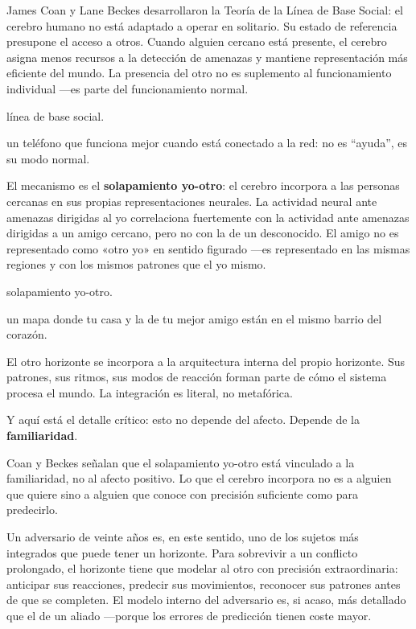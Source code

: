 \noindent James Coan y Lane Beckes desarrollaron la Teoría de la Línea de Base Social: el cerebro humano no está adaptado a operar en solitario. Su estado de referencia presupone el acceso a otros. Cuando alguien cercano está presente, el cerebro asigna menos recursos a la detección de amenazas y mantiene representación más eficiente del mundo. La presencia del otro no es suplemento al funcionamiento individual —es parte del funcionamiento normal.

\begin{fisica}
 línea de base social.

 un teléfono que funciona mejor cuando está conectado a la red: no es “ayuda”, es su modo normal.
\end{fisica}
El mecanismo es el \textbf{solapamiento yo-otro}: el cerebro incorpora a las personas cercanas en sus propias representaciones neurales. La actividad neural ante amenazas dirigidas al yo correlaciona fuertemente con la actividad ante amenazas dirigidas a un amigo cercano, pero no con la de un desconocido. El amigo no es representado como «otro yo» en sentido figurado —es representado en las mismas regiones y con los mismos patrones que el yo mismo.

\begin{fisica}
 solapamiento yo-otro.

 un mapa donde tu casa y la de tu mejor amigo están en el mismo barrio del corazón.
\end{fisica}
El otro horizonte se incorpora a la arquitectura interna del propio horizonte. Sus patrones, sus ritmos, sus modos de reacción forman parte de cómo el sistema procesa el mundo. La integración es literal, no metafórica.

Y aquí está el detalle crítico: esto no depende del afecto. Depende de la \textbf{familiaridad}.

\noindent Coan y Beckes señalan que el solapamiento yo-otro está vinculado a la familiaridad, no al afecto positivo. Lo que el cerebro incorpora no es a alguien que quiere sino a alguien que conoce con precisión suficiente como para predecirlo.

Un adversario de veinte años es, en este sentido, uno de los sujetos más integrados que puede tener un horizonte. Para sobrevivir a un conflicto prolongado, el horizonte tiene que modelar al otro con precisión extraordinaria: anticipar sus reacciones, predecir sus movimientos, reconocer sus patrones antes de que se completen. El modelo interno del adversario es, si acaso, más detallado que el de un aliado —porque los errores de predicción tienen coste mayor.

